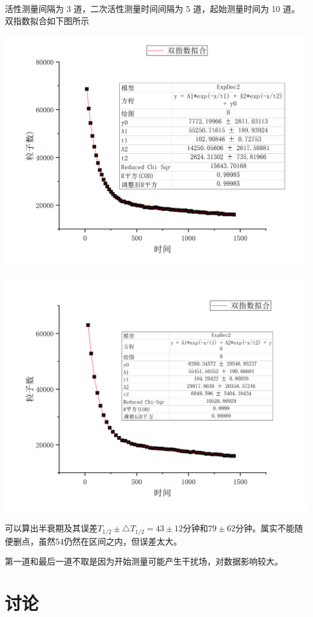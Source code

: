 \documentclass[hyperref]{ctexart}
\begin{document}
\begin{multicols}{2}
	活性测量间隔为 3 道，二次活性测量时间间隔为 5 道，起始测量时间为 10 道。
	双指数拟合如下图所示
	\begin{center}\includegraphics[scale=0.3]{t42}\end{center}
	\begin{center}\includegraphics[scale=0.3]{t44}\end{center}
	可以算出半衰期及其误差$T_{1/2} \pm \triangle T_{1/2}=43 \pm 12$分钟和$79 \pm 62$分钟。属实不能随便删点，虽然54仍然在区间之内，但误差太大。

	第一道和最后一道不取是因为开始测量可能产生干扰场，对数据影响较大。

	\section{讨论}

\end{multicols}
\end{document}
